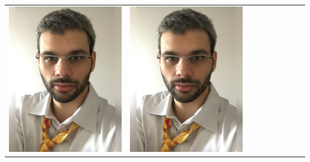 \documentclass[landscape,a0paper,fontscale=0.292]{baposter}
\begin{document}
\begin{poster}
{\begin{center}
\begin{tabularx}{\linewidth}{X X X X X X X X X}
\includegraphics[width=\linewidth]{censi.jpg}&
\includegraphics[width=\linewidth]{censi.jpg}&

\end{tabularx}
\end{center}}
\end{poster}
\end{document}
